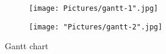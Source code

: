 \documentclass[11pt]{article}
\begin{document}
\begin{figure}[!p]
    \centering
    \begin{subfigure}{\linewidth}
      \texttt{[image: Pictures/gantt-1".jpg]}
    \end{subfigure}
    \begin{subfigure}{\linewidth}
      \texttt{[image: "Pictures/gantt-2".jpg]}
    \end{subfigure}
    \caption{Gantt chart}
    \label{fig:image10}
\end{figure}




\newpage


\end{document}
